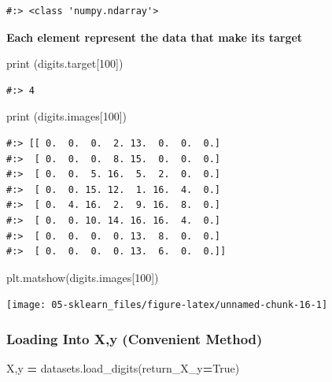 \documentclass[
]{book}
\newenvironment{Shaded}{\begin{snugshade}}{\end{snugshade}}
\newcommand{\BuiltInTok}[1]{#1}
\newcommand{\DecValTok}[1]{\textcolor[rgb]{0.06,0.06,0.06}{#1}}
\newcommand{\NormalTok}[1]{#1}
\newcommand{\OperatorTok}[1]{\textcolor[rgb]{0.43,0.43,0.43}{\textbf{#1}}}
\newcommand{\VariableTok}[1]{\textcolor[rgb]{0,0,0}{#1}}
\begin{document}
\begin{verbatim}
#:> <class 'numpy.ndarray'>
\end{verbatim}

\textbf{Each element represent the data that make its target}

\begin{Shaded}
\begin{Highlighting}[]
\BuiltInTok{print}\NormalTok{ (digits.target[}\DecValTok{100}\NormalTok{])}
\end{Highlighting}
\end{Shaded}

\begin{verbatim}
#:> 4
\end{verbatim}

\begin{Shaded}
\begin{Highlighting}[]
\BuiltInTok{print}\NormalTok{ (digits.images[}\DecValTok{100}\NormalTok{])}
\end{Highlighting}
\end{Shaded}

\begin{verbatim}
#:> [[ 0.  0.  0.  2. 13.  0.  0.  0.]
#:>  [ 0.  0.  0.  8. 15.  0.  0.  0.]
#:>  [ 0.  0.  5. 16.  5.  2.  0.  0.]
#:>  [ 0.  0. 15. 12.  1. 16.  4.  0.]
#:>  [ 0.  4. 16.  2.  9. 16.  8.  0.]
#:>  [ 0.  0. 10. 14. 16. 16.  4.  0.]
#:>  [ 0.  0.  0.  0. 13.  8.  0.  0.]
#:>  [ 0.  0.  0.  0. 13.  6.  0.  0.]]
\end{verbatim}

\begin{Shaded}
\begin{Highlighting}[]
\NormalTok{plt.matshow(digits.images[}\DecValTok{100}\NormalTok{]) }
\end{Highlighting}
\end{Shaded}

\texttt{[image: 05-sklearn\_files/figure-latex/unnamed-chunk-16-1]}

\hypertarget{loading-into-xy-convenient-method}{%
\subsubsection{Loading Into X,y (Convenient Method)}\label{loading-into-xy-convenient-method}}

\begin{Shaded}
\begin{Highlighting}[]
\NormalTok{X,y }\OperatorTok{=}\NormalTok{ datasets.load_digits(return_X_y}\OperatorTok{=}\VariableTok{True}\NormalTok{)}
\end{Highlighting}
\end{Shaded}
\end{document}
